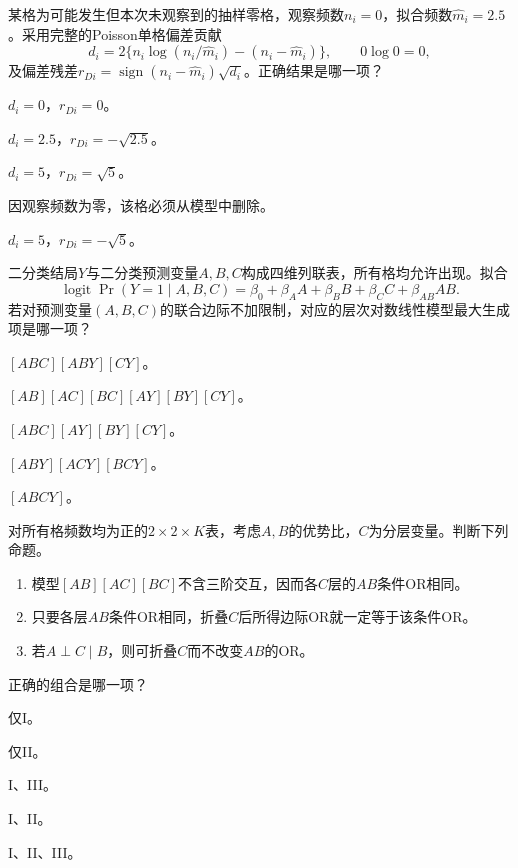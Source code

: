 \par\noindent\begin{minipage}{\linewidth}
某格为可能发生但本次未观察到的抽样零格，观察频数$n_i=0$，拟合频数$\widehat m_i=2.5$。采用完整的Poisson单格偏差贡献\[d_i=2\{n_i\log(n_i/\widehat m_i)-(n_i-\widehat m_i)\},\qquad 0\log0=0,\]及偏差残差$r_{Di}=\operatorname{sign}(n_i-\widehat m_i)\sqrt{d_i}$。正确结果是哪一项？
\begin{choices}
\item $d_i=0$，$r_{Di}=0$。
\item $d_i=2.5$，$r_{Di}=-\sqrt{2.5}$。
\item $d_i=5$，$r_{Di}=\sqrt5$。
\item 因观察频数为零，该格必须从模型中删除。
\item $d_i=5$，$r_{Di}=-\sqrt5$。
\end{choices}
\end{minipage}\par\medskip

\par\noindent\begin{minipage}{\linewidth}
二分类结局$Y$与二分类预测变量$A,B,C$构成四维列联表，所有格均允许出现。拟合\[\operatorname{logit}\Pr(Y=1\mid A,B,C)=\beta_0+\beta_AA+\beta_BB+\beta_CC+\beta_{AB}AB.\]若对预测变量$(A,B,C)$的联合边际不加限制，对应的层次对数线性模型最大生成项是哪一项？
\begin{choices}
\item $[ABC][ABY][CY]$。
\item $[AB][AC][BC][AY][BY][CY]$。
\item $[ABC][AY][BY][CY]$。
\item $[ABY][ACY][BCY]$。
\item $[ABCY]$。
\end{choices}
\end{minipage}\par\medskip

\par\noindent\begin{minipage}{\linewidth}
对所有格频数均为正的$2\times2\times K$表，考虑$A,B$的优势比，$C$为分层变量。判断下列命题。\begin{enumerate}[label=\Roman*.]\item 模型$[AB][AC][BC]$不含三阶交互，因而各$C$层的$AB$条件OR相同。\item 只要各层$AB$条件OR相同，折叠$C$后所得边际OR就一定等于该条件OR。\item 若$A\perp C\mid B$，则可折叠$C$而不改变$AB$的OR。\end{enumerate}正确的组合是哪一项？
\begin{choices}
\item 仅I。
\item 仅II。
\item I、III。
\item I、II。
\item I、II、III。
\end{choices}
\end{minipage}\par\medskip

